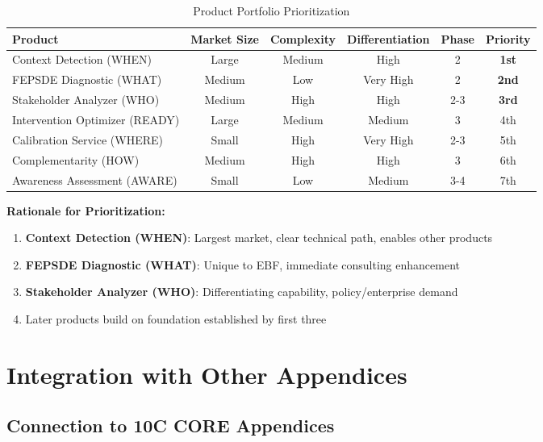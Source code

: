 \begin{table}[htbp]
\centering
\caption{Product Portfolio Prioritization}
\label{tab:vvv-portfolio}
\renewcommand{\arraystretch}{1.3}
\begin{tabular}{@{}lccccc@{}}
\toprule
\textbf{Product} & \textbf{Market Size} & \textbf{Complexity} & \textbf{Differentiation} & \textbf{Phase} & \textbf{Priority} \\
\midrule
Context Detection (WHEN) & Large & Medium & High & 2 & \textbf{1st} \\
FEPSDE Diagnostic (WHAT) & Medium & Low & Very High & 2 & \textbf{2nd} \\
Stakeholder Analyzer (WHO) & Medium & High & High & 2-3 & \textbf{3rd} \\
Intervention Optimizer (READY) & Large & Medium & Medium & 3 & 4th \\
Calibration Service (WHERE) & Small & High & Very High & 2-3 & 5th \\
Complementarity (HOW) & Medium & High & High & 3 & 6th \\
Awareness Assessment (AWARE) & Small & Low & Medium & 3-4 & 7th \\
\bottomrule
\end{tabular}
\end{table}

\textbf{Rationale for Prioritization:}

\begin{enumerate}
\item \textbf{Context Detection (WHEN)}: Largest market, clear technical path, enables other products
\item \textbf{FEPSDE Diagnostic (WHAT)}: Unique to EBF, immediate consulting enhancement
\item \textbf{Stakeholder Analyzer (WHO)}: Differentiating capability, policy/enterprise demand
\item Later products build on foundation established by first three
\end{enumerate}


\section{Integration with Other Appendices}
\label{sec:vvv3-integration}

\subsection{Connection to 10C CORE Appendices}

